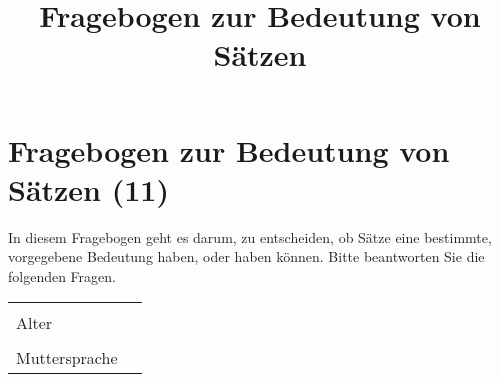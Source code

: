 \documentclass[a4paper, 8pt]{article}
\title{Fragebogen zur Bedeutung von Sätzen}
\begin{document}
\section*{Fragebogen zur Bedeutung von Sätzen (11)}

In diesem Fragebogen geht es darum, zu entscheiden, ob Sätze eine bestimmte, vorgegebene Bedeutung haben, oder haben können. Bitte beantworten Sie die folgenden Fragen.


\begin{tabular}{|l|p{5cm}|}
\hline
& \\
Alter & \\
\hline
& \\
Muttersprache & \\
\hline
\end{tabular}
\end{document}
